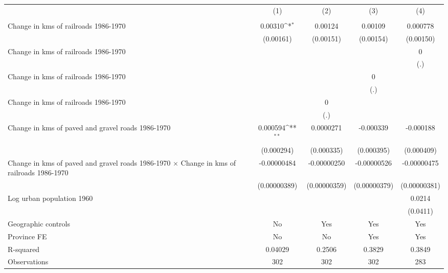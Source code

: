 {
\def\sym#1{\ifmmode^{#1}\else\(^{#1}\)\fi}
\begin{tabular}{l*{4}{c}}
\hline\hline
                &\multicolumn{1}{c}{(1)}&\multicolumn{1}{c}{(2)}&\multicolumn{1}{c}{(3)}&\multicolumn{1}{c}{(4)}\\
                &\multicolumn{1}{c}{}&\multicolumn{1}{c}{}&\multicolumn{1}{c}{}&\multicolumn{1}{c}{}\\
\hline
Change in kms of railroads 1986-1970&  0.00310\sym{*}  &  0.00124         &  0.00109         & 0.000778         \\
                &(0.00161)         &(0.00151)         &(0.00154)         &(0.00150)         \\
[1em]
Change in kms of railroads 1986-1970&                  &                  &                  &        0         \\
                &                  &                  &                  &      (.)         \\
[1em]
Change in kms of railroads 1986-1970&                  &                  &        0         &                  \\
                &                  &                  &      (.)         &                  \\
[1em]
Change in kms of railroads 1986-1970&                  &        0         &                  &                  \\
                &                  &      (.)         &                  &                  \\
[1em]
Change in kms of paved and gravel roads 1986-1970& 0.000594\sym{**} &0.0000271         &-0.000339         &-0.000188         \\
                &(0.000294)         &(0.000335)         &(0.000395)         &(0.000409)         \\
[1em]
Change in kms of paved and gravel roads 1986-1970 $\times$ Change in kms of railroads 1986-1970&-0.00000484         &-0.00000250         &-0.00000526         &-0.00000475         \\
                &(0.00000389)         &(0.00000359)         &(0.00000379)         &(0.00000381)         \\
[1em]
Log urban population 1960&                  &                  &                  &   0.0214         \\
                &                  &                  &                  & (0.0411)         \\
\hline
Geographic controls&       No         &      Yes         &      Yes         &      Yes         \\
Province FE     &       No         &       No         &      Yes         &      Yes         \\
R-squared       &  0.04029         &   0.2506         &   0.3829         &   0.3849         \\
Observations    &      302         &      302         &      302         &      283         \\
\hline\hline
\end{tabular}
}
